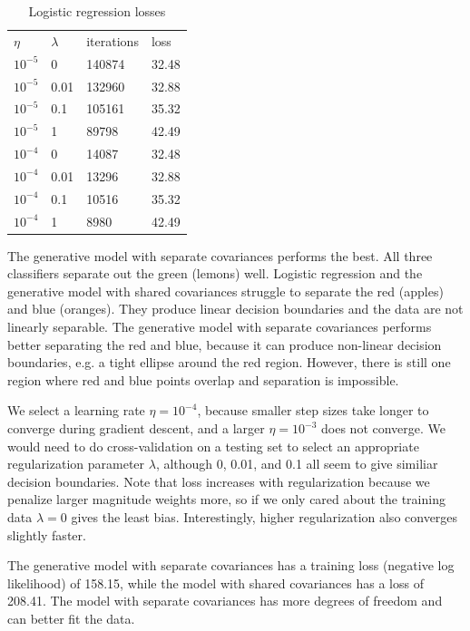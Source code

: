 \documentclass[submit]{harvardml}
\begin{document}
\begin{solution}
\begin{sol}

\begin{table}[h!]
\caption{Logistic regression losses}
\begin{tabular}{llll}
$\eta$ & $\lambda$ & iterations & loss  \\
$10^{-5}$ & 0      & 140874     & 32.48 \\
$10^{-5}$ & 0.01   & 132960     & 32.88 \\
$10^{-5}$ & 0.1    & 105161     & 35.32 \\
$10^{-5}$ & 1      & 89798      & 42.49 \\
$10^{-4}$ & 0      & 14087      & 32.48 \\
$10^{-4}$ & 0.01   & 13296      & 32.88 \\
$10^{-4}$ & 0.1    & 10516      & 35.32 \\
$10^{-4}$ & 1      & 8980       & 42.49
\end{tabular}
\end{table}

The generative model with separate covariances performs the best.
All three classifiers separate out the green (lemons) well.
Logistic regression and the generative model with shared covariances struggle to separate the red (apples) and blue (oranges).
They produce linear decision boundaries and the data are not linearly separable.
The generative model with separate covariances performs better separating the red and blue,
because it can produce non-linear decision boundaries, e.g. a tight ellipse around the red region.
However, there is still one region where red and blue points overlap and separation is impossible.

We select a learning rate $\eta = 10^{-4}$, because smaller step sizes take longer to converge during gradient descent, and a larger $\eta = 10^{-3}$ does not converge.
We would need to do cross-validation on a testing set to select an appropriate regularization parameter $\lambda$, although 0, 0.01, and 0.1 all seem to give similiar decision boundaries.
Note that loss increases with regularization because we penalize larger magnitude weights more, so if we only cared about the training data $\lambda = 0$ gives the least bias.
Interestingly, higher regularization also converges slightly faster.

The generative model with separate covariances has a training loss (negative log likelihood) of 158.15, while the model with shared covariances has a loss of 208.41.
The model with separate covariances has more degrees of freedom and can better fit the data.


\end{sol}
\end{solution}
\end{document}
